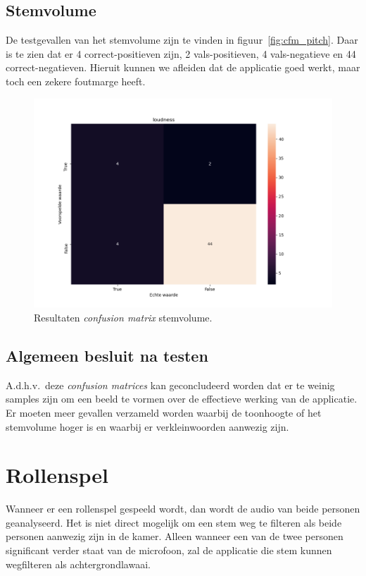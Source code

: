 \subsection{Stemvolume}

De testgevallen van het stemvolume zijn te vinden in figuur~\ref{fig:cfm_pitch}. Daar is te zien dat er 4 correct-positieven zijn, 2 vals-positieven, 4 vals-negatieve en 44 correct-negatieven.
Hieruit kunnen we afleiden dat de applicatie goed werkt, maar toch een zekere foutmarge heeft.
\begin{figure}
	\centering
	\includegraphics[width=1\textwidth]{./img/cfm_loudness}
	\caption{\label{fig:cfm_loudness} Resultaten \textit{confusion matrix} stemvolume.}
\end{figure}

\subsection{Algemeen besluit na testen}
A.d.h.v.\ deze \textit{confusion matrices} kan geconcludeerd worden dat er te weinig samples zijn om een beeld te vormen over de effectieve werking van de applicatie. Er moeten meer gevallen verzameld worden waarbij de toonhoogte of het stemvolume hoger is en waarbij er verkleinwoorden aanwezig zijn.

\section{Rollenspel}
Wanneer er een rollenspel gespeeld wordt, dan wordt de audio van beide personen geanalyseerd. Het is niet direct mogelijk om een stem weg te filteren als beide personen aanwezig zijn in de kamer. Alleen wanneer een van de twee personen significant verder staat van de microfoon, zal de applicatie die stem kunnen wegfilteren als achtergrondlawaai.


